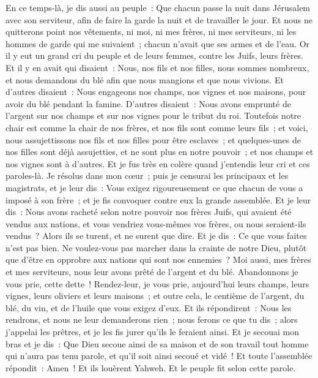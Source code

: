 \begin{multicols}{2}
En ce temps-là, je dis aussi au peuple~: Que chacun passe la nuit dans Jérusalem avec son serviteur, afin de faire la garde la nuit et de travailler le jour.
Et nous ne quitterons point nos vêtements, ni moi, ni mes frères, ni mes serviteurs, ni les hommes de garde qui me suivaient~; chacun n'avait que ses armes et de l'eau.
\VerseOne{}Or il y eut un grand cri du peuple et de leurs femmes, contre les Juifs, leurs frères.
Et il y en avait qui disaient~: Nous, nos fils et nos filles, nous sommes nombreux, et nous demandons du blé afin que nous mangions et que nous vivions.
Et d'autres disaient~: Nous engageons nos champs, nos vignes et nos maisons, pour avoir du blé pendant la famine.
D'autres disaient~: Nous avons emprunté de l'argent sur nos champs et sur nos vignes pour le tribut du roi.
Toutefois notre chair est comme la chair de nos frères, et nos fils sont comme leurs fils~; et voici, nous assujettissons nos fils et nos filles pour être esclaves~; et quelques-unes de nos filles sont déjà assujetties, et ne sont plus en notre pouvoir~; et nos champs et nos vignes sont à d'autres.
Et je fus très en colère quand j'entendis leur cri et ces paroles-là.
Je résolus dans mon cœur~; puis je censurai les principaux et les magistrats, et je leur dis~: Vous exigez rigoureusement ce que chacun de vous a imposé à son frère~; et je fis convoquer contre eux la grande assemblée. 
Et je leur dis~: Nous avons racheté selon notre pouvoir nos frères Juifs, qui avaient été vendus aux nations, et vous vendriez vous-mêmes vos frères, ou nous seraient-ils vendus~? Alors ils se turent, et ne surent que dire. 
Et je dis~: Ce que vous faites n'est pas bien. Ne voulez-vous pas marcher dans la crainte de notre Dieu, plutôt que d'être en opprobre aux nations qui sont nos ennemies~?
Moi aussi, mes frères et mes serviteurs, nous leur avons prêté de l'argent et du blé. Abandonnons je vous prie, cette dette~!
Rendez-leur, je vous prie, aujourd'hui leurs champs, leurs vignes, leurs oliviers et leurs maisons~; et outre cela, le centième de l'argent, du blé, du vin, et de l'huile que vous exigez d'eux.
Et ils répondirent~: Nous les rendrons, et nous ne leur demanderons rien~; nous ferons ce que tu dis~; alors j'appelai les prêtres, et je les fis jurer qu'ils le feraient ainsi.
Et je secouai mon bras et je dis~: Que Dieu secoue ainsi de sa maison et de son travail tout homme qui n'aura pas tenu parole, et qu'il soit ainsi secoué et vidé~! Et toute l'assemblée répondit~: Amen~! Et ils louèrent Yahweh. Et le peuple fit selon cette parole.

\end{multicols}

